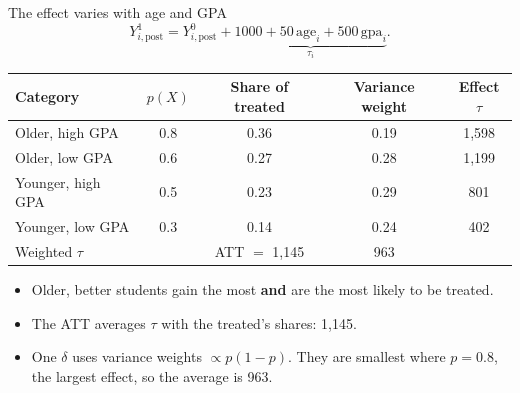 \documentclass[
  11pt,
  ignorenonframetext,
  aspectratio=169,
]{beamer}
\providecommand{\tightlist}{%
  \setlength{\itemsep}{0pt}\setlength{\parskip}{0pt}}
\begin{document}
\begin{frame}{The effect varies with age and GPA}
\protect{}\label{the-effect-varies-with-age-and-gpa}
\[
Y^1_{i,\text{post}} = Y^0_{i,\text{post}} + \underbrace{1000 + 50\,\text{age}_i + 500\,\text{gpa}_i}_{\tau_i} .
\]

\begin{center}\small
\begin{tabular}{lcccc}
\toprule
Category & $p(X)$ & Share of treated & Variance weight & Effect $\tau$ \\
\midrule
Older, high GPA   & 0.8 & 0.36 & 0.19 & 1,598 \\
Older, low GPA    & 0.6 & 0.27 & 0.28 & 1,199 \\
Younger, high GPA & 0.5 & 0.23 & 0.29 & 801 \\
Younger, low GPA  & 0.3 & 0.14 & 0.24 & 402 \\
\midrule
Weighted $\tau$ & & ATT $=$ 1,145 & 963 & \\
\bottomrule
\end{tabular}
\end{center}

\begin{itemize}
\tightlist
\item
  Older, better students gain the most \textbf{and} are the most likely
  to be treated.
\item
  The ATT averages \(\tau\) with the treated's shares: 1,145.
\item
  One \(\delta\) uses variance weights \(\propto p(1-p)\). They are
  smallest where \(p = 0.8\), the largest effect, so the average is 963.
\end{itemize}
\end{frame}
\end{document}
